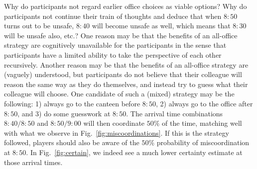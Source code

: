 \documentclass[twocolumn,a4paper,superscriptaddress,nofootinbib]{revtex4}
\begin{document}
Why do participants not regard earlier office choices as viable options? Why do participants not continue their train of thoughts and deduce that when $8{:}50$ turns out to be unsafe, $8{:}40$ will become unsafe as well, which means that $8{:}30$ will be unsafe also, etc.? One reason may be that the benefits of an all-office strategy are cognitively unavailable for the participants in the sense that participants have a limited ability to take the perspective of each other recursively. Another reason may be that the benefits of an all-office strategy are (vaguely) understood, but participants do not believe that their colleague will reason the same way as they do themselves, and instead try to guess what their colleague will choose. One candidate of such a (mixed) strategy may be the following: 1) always go to the canteen before $8{:}50$, 2) always go to the office after $8{:}50$, and 3) do some guesswork at $8{:}50$. The arrival time combinations $8{:}40/8{:}50$ and $8{:}50/9{:}00$ will then coordinate $50\%$ of the time, matching well with what we observe in Fig.~\ref{fig:miscoordinations}. If this is the strategy followed, players should also be aware of the $50\%$ probability of miscoordination at $8{:}50$. In Fig.~\ref{fig:certain}, we indeed see a much lower certainty estimate at those arrival times.
\end{document}
